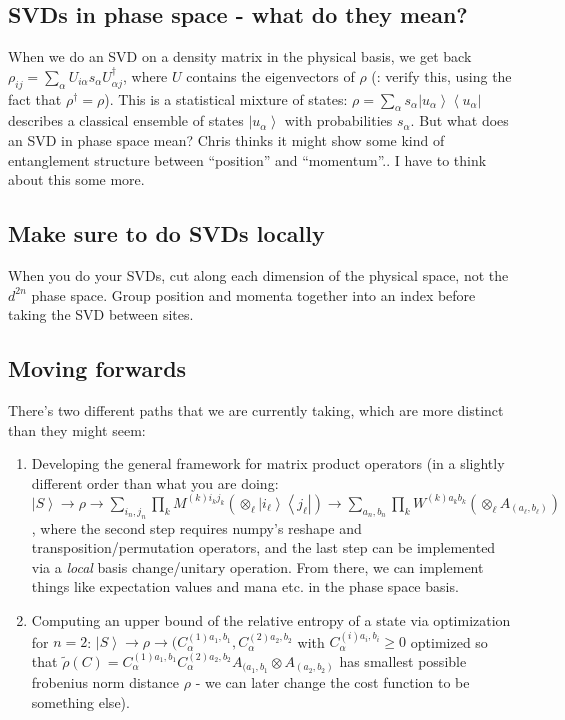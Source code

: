 \documentclass{report}
\begin{document}
 \subsection{SVDs in phase space - what do they mean?}
 
 When we do an SVD on a density matrix in the physical basis, we get back $\rho_{ij}=\sum_{\alpha} U_{i\alpha}s_{\alpha}U^\dagger_{\alpha j}$, where $U$ contains the eigenvectors of $\rho$ (\todo: verify this, using the fact that $\rho^\dagger=\rho$). This is a statistical mixture of states: $\rho=\sum_\alpha s_\alpha\left|u_\alpha\right>\left<u_\alpha\right|$ describes a classical ensemble of states $\left|u_\alpha\right>$ with probabilities $s_\alpha$. But what does an SVD in phase space mean? Chris thinks it might show some kind of entanglement structure between ``position'' and ``momentum''.. I have to think about this some more. 
 
 \subsection{Make sure to do SVDs locally}
 
 When you do your SVDs, cut along each dimension of the physical space, not the $d^{2n}$ phase space. Group position and momenta together into an index before taking the SVD between sites.  
 
 \subsection{Moving forwards}
 There's two different paths that we are currently taking, which are more distinct than they might seem:
 \begin{enumerate}
 \item Developing the general framework for matrix product operators (in a slightly different order than what you are doing: $\left|S\right>\to \rho \to \sum_{i_n,j_n}\prod_k M^{(k)i_kj_k}(\otimes_\ell \left|i_\ell \right>\left<j_\ell \right|)\to \sum_{a_n,b_n}\prod_kW^{(k)a_kb_k}(\otimes_\ell A_{(a_\ell,b_\ell)})$, where the second step requires numpy's reshape and transposition/permutation operators, and the last step can be implemented via a \textit{local} basis change/unitary operation. From there, we can implement things like expectation values and mana etc. in the phase space basis.
 \item Computing an upper bound of the relative entropy of a state via optimization for $n=2$: $\left|S\right>\to \rho\to (C_\alpha^{(1)a_1,b_1}, C_\alpha^{(2)a_2,b_2}$ with $C_\alpha^{(i)a_i,b_i}\geq 0$ optimized so that $\tilde\rho(C) = C_\alpha^{(1)a_1,b_1}C_\alpha^{(2)a_2,b_2}A_{(a_1,b_1}\otimes A_{(a_2,b_2)}$ has smallest possible frobenius norm distance $\rho$ - we can later change the cost function to be something else).
 \end{enumerate}
 
\end{document}
